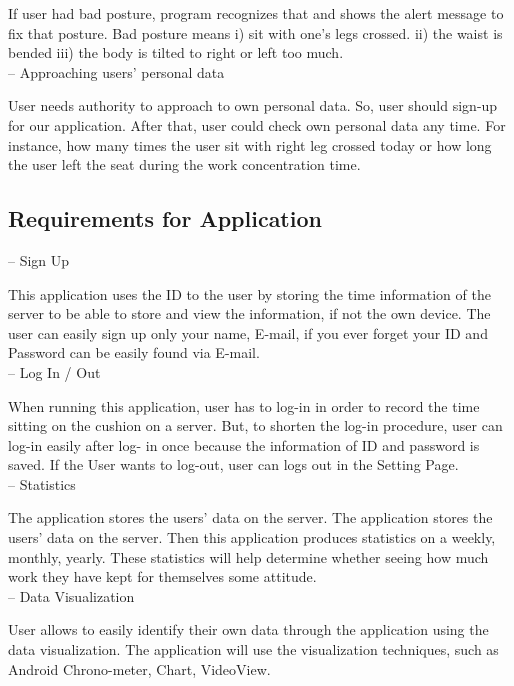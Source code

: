 \documentclass[conference]{IEEEtran}
\begin{document}
If user had bad posture, program recognizes that and shows the alert message to fix that posture.  Bad posture means i) sit with one's legs crossed. ii) the waist is bended iii) the body is tilted to right or left too much.\\

-- Approaching users' personal data

User needs authority to approach to own personal data. So, user should sign-up for our application. After that, user could check own personal data any time. For instance, how many times the user sit with right leg crossed today or how long the user left the seat during the work concentration time.\\

\subsection{Requirements for Application}
-- Sign Up

This application uses the ID to the user by storing the time information of the server to be able to store and view the information, if not the own device. The user can easily sign up only your name, E-mail, if you ever forget your ID and Password can be easily found via E-mail.\\

-- Log In / Out

When running this application, user has to log-in in order to record the time sitting on the cushion on a server. But, to shorten the log-in procedure, user can log-in easily after log- in once because the information of ID and password is saved. If the User wants to log-out, user can logs out in the Setting Page.\\

-- Statistics

The application stores the users' data on the server. The application stores the users' data on the server. Then this application produces statistics on a weekly, monthly, yearly. These statistics will help determine whether seeing how much work they have kept for themselves some attitude.\\

-- Data Visualization

User allows to easily identify their own data through the application using the data visualization. The application will use the visualization techniques, such as Android Chrono-meter, Chart, VideoView.\\
\end{document}
